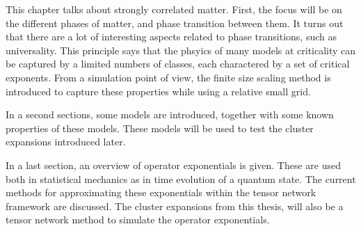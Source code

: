 This chapter talks about strongly correlated matter. First, the focus will be on the different phases of matter, and phase transition between them. It turns out that there are a lot of interesting aspects related to phase transitions, such as universality. This principle says that the phsyics of many models at criticality can be captured by a limited numbers of classes, each charactered by a set of critical exponents. From a simulation point of view, the finite size scaling method is introduced to capture these properties while using a relative small grid.

In a second sections, some models are introduced, together with some known properties of these models. These models will be used to test the cluster expansions introduced later.

In a last section, an overview of operator exponentials is given. These are used both in statistical mechanics as in time evolution of a quantum state. The current methods for approximating these exponentials within the tensor network framework are discussed. The cluster expansions from this thesis, will also be a tensor network method to simulate the operator exponentials.